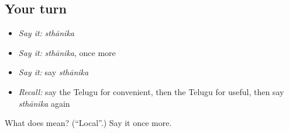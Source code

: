 \subsection*{Your turn}
\begin{itemize}
\raggedright
  \item \emph{Say it:} \emph{sthānika}
  \item \emph{Say it:} \emph{sthānika}, once more
  \item \emph{Say it:} say \emph{sthānika}
  \item \emph{Recall:} say the Telugu for convenient, then the Telugu for useful, then say \emph{sthānika} again
\end{itemize}

\begin{tcolorbox}[breakable,colback=teal!4,colframe=teal!35!black,title={Before you move on}]
What does  mean? (\textquotedblleft{}Local\textquotedblright{}.) Say it once more.
\end{tcolorbox}
